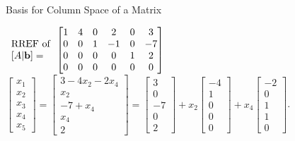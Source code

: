 \documentclass[xcolor=dvipsnames,aspectratio=169,t]{beamer}
\begin{document}
\begin{frame}{Basis for Column Space of a Matrix}
    {\small
    $\begin{array}{l}\text{RREF of} \\ {[A|\mathbf{b}]}= \end{array}
    \begin{bmatrix}
      1 & 4 & 0 & 2 & 0 & 3\\
      0 & 0 & 1 & -1 & 0 & -7\\
      0 & 0 & 0 & 0 & 1 & 2\\
      0 & 0 & 0 & 0 & 0 & 0
    \end{bmatrix}$
    \qquad
    $\begin{bmatrix} x_1 \\ x_2 \\ x_3 \\ x_4 \\ x_5 \end{bmatrix} =
      \begin{bmatrix} 3 -4x_2 - 2x_4 \\ x_2 \\ -7+ x_4 \\ x_4 \\ 2 \end{bmatrix} = 
          \begin{bmatrix} 3 \\ 0  \\ -7 \\ 0 \\ 2 \end{bmatrix}
    + x_2 \begin{bmatrix} -4 \\ 1 \\ 0 \\ 0 \\ 0 \end{bmatrix}
    + x_4 \begin{bmatrix} -2 \\ 0 \\ 1 \\ 1 \\ 0 \end{bmatrix}$.
    \bigskip
    
}
\end{frame}
\end{document}
